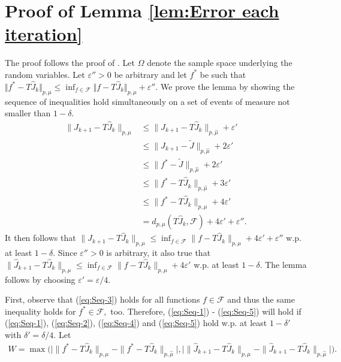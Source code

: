 \documentclass[12pt,technote,onecolumn]{IEEEtran}
\begin{document}
\section*{Proof of Lemma \ref{lem:Error each iteration}}
\begin{IEEEproof}
	The proof follows the proof of \cite[Lemma 1]{munos2008finite}.
	Let $\Omega$ denote the sample space underlying the random variables.
	Let $\varepsilon''>0$ be arbitrary and let $f^{*}$ be such that
	$\Vert f^{*}-T\widehat{J}_{k}\Vert _{p,\mu}\leq\inf_{f\in\mathcal{F}}\Vert f-T\widehat{J}_{k}\Vert _{p,\mu}+\varepsilon''.$
	We prove the lemma by showing the sequence of inequalities hold simultaneously
	on a set of events of measure not smaller than $1-\delta$.
	\begin{align}
	\|\widehat{J}_{k+1}-T\widehat{J}_{k}\|_{p,\mu} & \leq\|\widehat{J}_{k+1}-T\widehat{J}_{k}\|_{p,\hat{\mu}}+\varepsilon'\label{eq:Seq-1}\\
	& \leq\|\widehat{J}_{k+1}-\widetilde{J}\|_{p,\hat{\mu}}+2\varepsilon'\label{eq:Seq-2}\\
	& \leq\|f^{*}-\widetilde{J}\|_{p,\hat{\mu}}+2\varepsilon'\label{eq:Seq-3}\\
	& \leq\|f^{*}-T\widehat{J}_{k}\|_{p,\hat{\mu}}+3\varepsilon'\label{eq:Seq-4}\\
	& \leq\|f^{*}-T\widehat{J}_{k}\|_{p,\mu}+4\varepsilon'\label{eq:Seq-5}\\
	& =d_{p,\mu}(T\widehat{J}_{k},\mathcal{F})+4\varepsilon'+\varepsilon''.
	\end{align}
	It then follows that $\|\widehat{J}_{k+1}-T\widehat{J}_{k}\|_{p,\mu}\leq\inf_{f\in\mathcal{F}}\|f-T\widehat{J}_{k}\|_{p,\mu}+4\varepsilon'+\varepsilon''$
	w.p. at least $1-\delta.$ Since $\varepsilon''>0$ is arbitrary,
	it also true that $\|\widehat{J}_{k+1}-T\widehat{J}_{k}\|_{p,\mu}\leq\inf_{f\in\mathcal{F}}\|f-T\widehat{J}_{k}\|_{p,\mu}+4\varepsilon'$
	w.p. at least $1-\delta.$ The lemma follows by choosing $\varepsilon'=\varepsilon/4.$
	
	First, observe that (\ref{eq:Seq-3}) holds for all functions $f\in\mathcal{F}$
	and thus the same inequality holds for $f^{*}\in\mathcal{F},$
	too. Therefore, (\ref{eq:Seq-1}) - (\ref{eq:Seq-5}) will hold if
	(\ref{eq:Seq-1}), (\ref{eq:Seq-2}), (\ref{eq:Seq-4}) and (\ref{eq:Seq-5})
	hold w.p. at least $1-\delta'$ with $\delta'=\delta/4.$ Let
	\begin{equation*}
	\begin{aligned}
	W=\max\big(\big|\|f^{*}-T\widehat{J}_{k}\|_{p,\mu}-\|f^{*}-T\widehat{J}_{k}\|_{p,\hat{\mu}}\big|,
	\big|\|\widehat{J}_{k+1}-T\widehat{J}_{k}\|_{p,\mu}-\|\widehat{J}_{k+1}-T\widehat{J}_{k}\|_{p,\hat{\mu}}\big|\big).
	\end{aligned}
	\end{equation*}
	

\end{IEEEproof}
\end{document}
